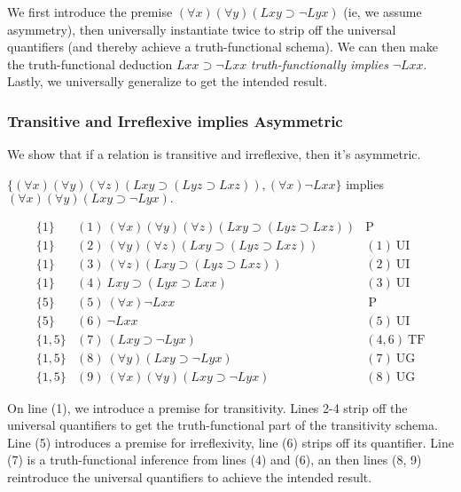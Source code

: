 \begin{aside}
    We first introduce the premise $(\forall x)(\forall y)(Lxy\supset\neg Lyx)$ (ie, we assume asymmetry), then universally instantiate twice to strip off the universal quantifiers (and thereby achieve a truth-functional schema). We can then make the truth-functional deduction $Lxx\supset\neg Lxx$ \emph{truth-functionally implies} $\lnot Lxx$. Lastly, we universally generalize to get the intended result. 
\end{aside}

\subsubsection*{Transitive and Irreflexive implies Asymmetric}
We show that if a relation is transitive and irreflexive, then it's asymmetric.
\begin{center}
$\{(\forall x)(\forall y)(\forall z)(Lxy\supset(Lyz\supset Lxz)), (\forall x)\neg Lxx\}$ implies $(\forall x)(\forall y)(Lxy\supset\neg Lyx).$
\end{center}
\[
\begin{array}{lll}
\{1\}   & (1)\  (\forall x)(\forall y)(\forall z)(Lxy\supset(Lyz\supset Lxz)) &  \mathrm{P}\\
\{1\}   & (2)\ (\forall y)(\forall z)(Lxy\supset(Lyz\supset Lxz)) & (1) \ \mathrm{UI}\\
\{1\}   & (3)\ (\forall z)(Lxy\supset(Lyz\supset Lxz)) &  (2)\ \mathrm{UI}\\
\{1\}   & (4)\ Lxy\supset(Lyx\supset Lxx)   & (3)\ \mathrm{UI}\\
\{5\}   & (5)\ (\forall x) \neg Lxx  & \ \mathrm{P}\\
\{5\}   & (6)\ \neg Lxx  & (5)\ \mathrm{UI}\\
\{1,5\}   & (7)\ (Lxy\supset\neg Lyx)  & (4,6)\ \mathrm{TF}\\
\{1,5\}   & (8)\ (\forall y)(Lxy\supset\neg Lyx)  & (7)\ \mathrm{UG}\\
\{1,5\}   & (9)\ (\forall x)(\forall y)(Lxy\supset\neg Lyx)  & (8)\ \mathrm{UG}
\end{array}
\]

\begin{aside}
    On line (1), we introduce a premise for transitivity. Lines 2-4 strip off the universal quantifiers to get the truth-functional part of the transitivity schema. Line (5) introduces a premise for irreflexivity, line (6) strips off its quantifier. Line (7) is a truth-functional inference from lines (4) and (6), an then lines (8, 9) reintroduce the universal quantifiers to achieve the intended result. 
\end{aside}

